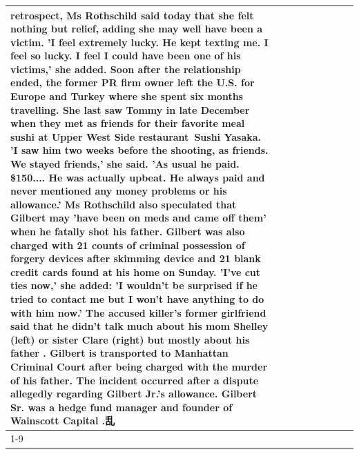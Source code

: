 \begin{table}[H]
\begin{tabular}{lllrlllll}
retrospect, Ms Rothschild said today that she felt nothing but relief, adding she may well have been a victim. 'I feel extremely lucky. He kept texting me. I feel so lucky. I feel I could have been one of his victims,' she added. Soon after the relationship ended, the former PR firm owner left the U.S. for Europe and Turkey where she spent six months  travelling. She last saw Tommy in late December when they met as friends for their favorite meal sushi at Upper West Side restaurant Sushi Yasaka. 'I saw him two weeks before the shooting, as friends. We stayed friends,' she said. 'As usual he paid. \$150.... He was actually upbeat. He always paid and never mentioned any money problems or his allowance.' Ms Rothschild also speculated that Gilbert may 'have been on meds and came off them' when he fatally shot his father. Gilbert was also charged with 21 counts of criminal possession of forgery devices after skimming device and 21 blank credit cards found at his home on Sunday. 'I've cut ties now,' she added: 'I wouldn’t be surprised if he tried to contact me but I won’t have anything to do with him now.' The accused killer's former girlfriend said that he didn't talk much about his mom Shelley (left) or sister Clare (right) but mostly about his father . Gilbert is transported to Manhattan Criminal Court  after being charged with the murder of his father. The incident occurred after a dispute allegedly regarding Gilbert Jr.'s allowance. Gilbert Sr. was a hedge fund manager and founder of Wainscott Capital .乱 \\
\cline{1-9} \cline{2-9}

\end{tabular}
\end{table}

